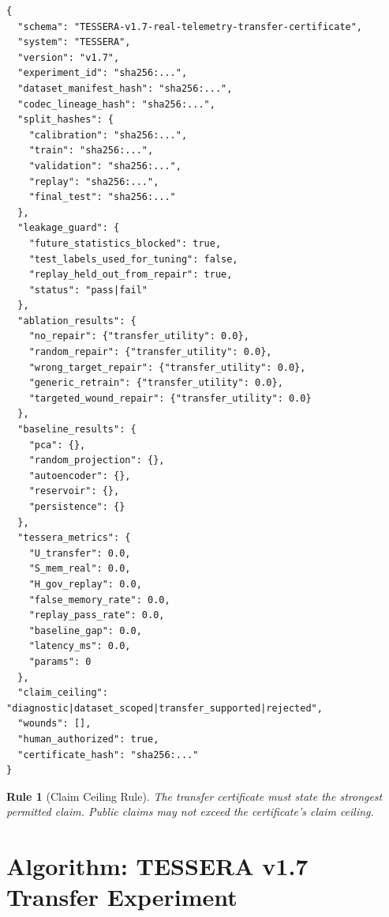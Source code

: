 \documentclass[12pt]{article}
\newtheorem{rulebox}{Rule}
\begin{document}
\begin{lstlisting}
{
  "schema": "TESSERA-v1.7-real-telemetry-transfer-certificate",
  "system": "TESSERA",
  "version": "v1.7",
  "experiment_id": "sha256:...",
  "dataset_manifest_hash": "sha256:...",
  "codec_lineage_hash": "sha256:...",
  "split_hashes": {
    "calibration": "sha256:...",
    "train": "sha256:...",
    "validation": "sha256:...",
    "replay": "sha256:...",
    "final_test": "sha256:..."
  },
  "leakage_guard": {
    "future_statistics_blocked": true,
    "test_labels_used_for_tuning": false,
    "replay_held_out_from_repair": true,
    "status": "pass|fail"
  },
  "ablation_results": {
    "no_repair": {"transfer_utility": 0.0},
    "random_repair": {"transfer_utility": 0.0},
    "wrong_target_repair": {"transfer_utility": 0.0},
    "generic_retrain": {"transfer_utility": 0.0},
    "targeted_wound_repair": {"transfer_utility": 0.0}
  },
  "baseline_results": {
    "pca": {},
    "random_projection": {},
    "autoencoder": {},
    "reservoir": {},
    "persistence": {}
  },
  "tessera_metrics": {
    "U_transfer": 0.0,
    "S_mem_real": 0.0,
    "H_gov_replay": 0.0,
    "false_memory_rate": 0.0,
    "replay_pass_rate": 0.0,
    "baseline_gap": 0.0,
    "latency_ms": 0.0,
    "params": 0
  },
  "claim_ceiling": "diagnostic|dataset_scoped|transfer_supported|rejected",
  "wounds": [],
  "human_authorized": true,
  "certificate_hash": "sha256:..."
}
\end{lstlisting}

\begin{rulebox}[Claim Ceiling Rule]
The transfer certificate must state the strongest permitted claim. Public claims
may not exceed the certificate's claim ceiling.
\end{rulebox}

\section{Algorithm: TESSERA v1.7 Transfer Experiment}
\end{document}
